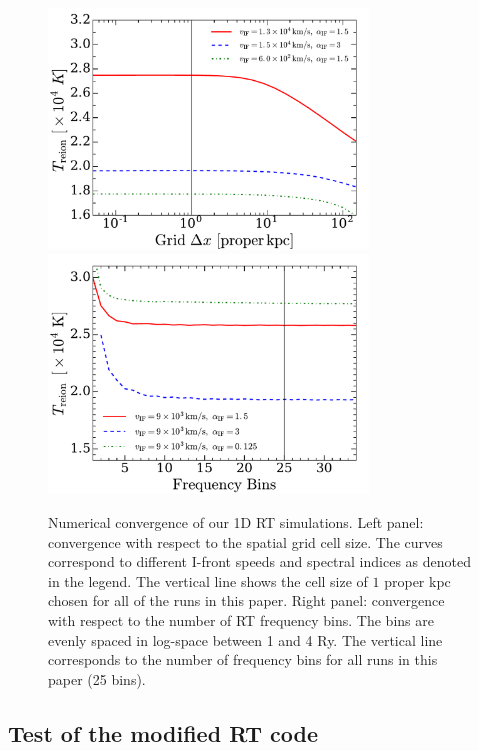 \documentclass[twocolumn]{aastex62}
\begin{document}
\begin{appendix}
\begin{figure}
\includegraphics[width=8.5cm]{fig12a.pdf}
\includegraphics[width=8.5cm]{fig12b.pdf}
\caption{Numerical convergence of our 1D RT simulations. Left panel: convergence with respect to the spatial grid cell size. The curves correspond to different I-front speeds and spectral indices as denoted in the legend.  The vertical line shows the cell size of $1$ proper kpc chosen for all of the runs in this paper. Right panel: convergence with respect to the number of RT frequency bins.  The bins are evenly spaced in log-space between 1 and 4 Ry. The vertical line corresponds to the number of frequency bins for all runs in this paper (25 bins).   }
\label{fig:convergence}
\end{figure}     

\subsection{Test of the modified RT code}


\end{appendix}
\end{document}
